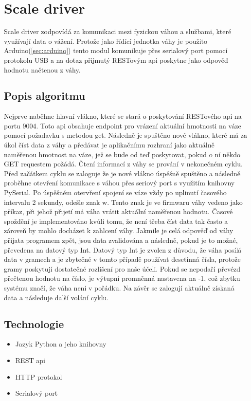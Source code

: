 \section{Scale driver}\label{sec:scale-driver}
Scale driver zodpovídá za komunikaci mezi fyzickou váhou a službami, které využívají data o vážení.\newline
Protože jako řídící jednotka váhy je použito Arduino(\ref{sec:arduino}) tento modul komunikuje přes serialový port pomocí protokolu USB a na dotaz přijmutý RESTovým api poskytne jako odpověď hodnotu načtenou z váhy.

\subsection*{Popis algoritmu}
Nejprve naběhne hlavní vlákno, které se stará o poskytování RESTového api na portu 9004.
Toto api obsahuje endpoint pro vrázení aktuální hmotnosti na váze pomocí požadavku s metodou get.
Následně je spuštěno nové vlákno, které má za úkol číst data z váhy a předávat je aplikačnímu rozhraní jako aktuálně naměřenou hmotnost na váze, jež se bude od teď poskytovat, pokud o ní někdo GET requestem požádá.
Čtení informací z váhy se prování v nekonečném cyklu.
Před začátkem cyklu se zaloguje že je nové vlákno úspěšně spuštěno a následně proběhne otevření komunikace s váhou přes seriový port s využitím knihovny PySerial.
Po úspěšném otervření spojení se váze vždy po uplinutí časového intervalu 2 sekundy, odešle znak w.
Tento znak je ve firmwaru váhy vedeno jako příkaz, při jehož přijetí má váha vrátit aktuální naměřenou hodnotu.
Časové spoždění je implementováno kvůli tomu, že není třeba číst data tak často a zároveň by mohlo docházet k zahlcení váhy.
Jakmile je celá odpověď od váhy přijata programem zpět, jsou data zvalidována a následně, pokud je to možné, převedena na datový typ Int.
Datový typ Int je zvolen z důvodu, že váha posílá data v gramech a je zbytečné v tomto případě používat desetinná čísla, protože gramy poskytují dostatečné rozlišení pro naše účeli.
Pokud se nepodaří převézd přečtenou hodnotu na číslo, je výtupní promněnná nastavena na -1, což zbytku systému značí, že váha není v pořádku.
Na závěr se zalogují aktuálně získaná data a následuje další volání cyklu.

\subsection*{Technologie}
\begin{itemize}
    \item Jazyk Python a jeho knihovny
    \item REST api
    \item HTTP protokol
    \item Serialový port
\end{itemize}

